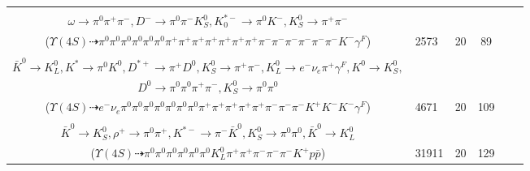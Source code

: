 \documentclass[landscape]{article}
\newcounter{rownumbers}
\newcommand\rn{\stepcounter{rownumbers}\arabic{rownumbers}}
\newcommand{\EOLP}{\\ \hline} %
\newcommand{\topoTags}[1]{#1} %
\begin{document}
\begin{longtable}{clcccc}
\rn & \makecell[l]{ $ 
\Upsilon(4S) \rightarrow B^{0} \bar{B}^{0} ,
B^{0} \rightarrow \pi^{0} \rho^{0} \pi^{+} \pi^{+} \rho^{-} \omega \omega D^{-} ,
\bar{B}^{0} \rightarrow \pi^{+} K_{0}^{*-} \gamma^{F} ,
\rho^{0} \rightarrow \pi^{+} \pi^{-} ,
\rho^{-} \rightarrow \pi^{0} \pi^{-} ,
\omega \rightarrow \pi^{0} \pi^{+} \pi^{-} ,
$ \\ $
\omega \rightarrow \pi^{0} \pi^{+} \pi^{-} ,
D^{-} \rightarrow \pi^{0} \pi^{-} K_{S}^{0} ,
K_{0}^{*-} \rightarrow \pi^{0} K^{-} ,
K_{S}^{0} \rightarrow \pi^{+} \pi^{-} 
$ \\ ($
\Upsilon(4S) \dashrightarrow \pi^{0} \pi^{0} \pi^{0} \pi^{0} \pi^{0} \pi^{0} \pi^{+} \pi^{+} \pi^{+} \pi^{+} \pi^{+} \pi^{+} \pi^{+} \pi^{-} \pi^{-} \pi^{-} \pi^{-} \pi^{-} \pi^{-} K^{-} \gamma^{F} 
$) } & \topoTags{2573 & }20 & 89 \EOLP

\rn & \makecell[l]{ $ 
\Upsilon(4S) \rightarrow B^{0} \bar{B}^{0} ,
B^{0} \rightarrow K^{-} K^{*+} ,
\bar{B}^{0} \rightarrow \eta K^{0} \bar{K}^{0} K^{*} K^{-} D^{*+} ,
K^{*+} \rightarrow \pi^{0} K^{+} ,
\eta \rightarrow \pi^{0} \pi^{+} \pi^{-} ,
K^{0} \rightarrow K_{S}^{0} ,
$ \\ $
\bar{K}^{0} \rightarrow K_{L}^{0} ,
K^{*} \rightarrow \pi^{0} K^{0} ,
D^{*+} \rightarrow \pi^{+} D^{0} ,
K_{S}^{0} \rightarrow \pi^{+} \pi^{-} ,
K_{L}^{0} \rightarrow e^{-} \nu_{e} \pi^{+} \gamma^{F} ,
K^{0} \rightarrow K_{S}^{0} ,
$ \\ $
D^{0} \rightarrow \pi^{0} \pi^{0} \pi^{+} \pi^{-} ,
K_{S}^{0} \rightarrow \pi^{0} \pi^{0} 
$ \\ ($
\Upsilon(4S) \dashrightarrow e^{-} \nu_{e} \pi^{0} \pi^{0} \pi^{0} \pi^{0} \pi^{0} \pi^{0} \pi^{0} \pi^{+} \pi^{+} \pi^{+} \pi^{+} \pi^{+} \pi^{-} \pi^{-} \pi^{-} K^{+} K^{-} K^{-} \gamma^{F} 
$) } & \topoTags{4671 & }20 & 109 \EOLP

\rn & \makecell[l]{ $ 
\Upsilon(4S) \rightarrow B^{0} \bar{B}^{0} ,
B^{0} \rightarrow \pi^{-} K^{*+} ,
\bar{B}^{0} \rightarrow \pi^{0} \pi^{0} \pi^{+} K^{*-} D^{0} p \bar{p} ,
K^{*+} \rightarrow \pi^{0} K^{+} ,
K^{*-} \rightarrow \pi^{-} \bar{K}^{0} ,
D^{0} \rightarrow \rho^{+} K^{*-} ,
$ \\ $
\bar{K}^{0} \rightarrow K_{S}^{0} ,
\rho^{+} \rightarrow \pi^{0} \pi^{+} ,
K^{*-} \rightarrow \pi^{-} \bar{K}^{0} ,
K_{S}^{0} \rightarrow \pi^{0} \pi^{0} ,
\bar{K}^{0} \rightarrow K_{L}^{0} 
$ \\ ($
\Upsilon(4S) \dashrightarrow \pi^{0} \pi^{0} \pi^{0} \pi^{0} \pi^{0} \pi^{0} K_{L}^{0} \pi^{+} \pi^{+} \pi^{-} \pi^{-} \pi^{-} K^{+} p \bar{p} 
$) } & \topoTags{31911 & }20 & 129 \EOLP


\end{longtable}
\end{document}

